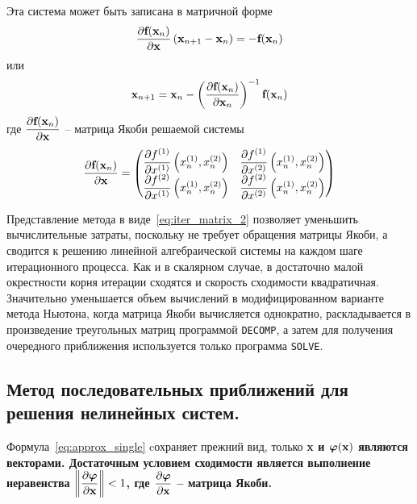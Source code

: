 \documentclass[../../calc-math-exam-2023.tex]{subfiles}
\begin{document}
    Эта система может быть записана в матричной форме
    \begin{equation}
        \frac{\partial \bf{f}(\bf{x}_n)}{\partial \bf{x}} \left( \bf{x}_{n+1} - \bf{x}_n \right) = -\bf{f}(\bf{x}_n) \label{eq:iter_matrix_1}
    \end{equation}
    или
    \begin{equation}
        \bf{x}_{n+1} = \bf{x}_n - \left( \frac{\partial \bf{f}(\bf{x}_n)}{\partial \bf{x}_n} \right)^{-1} \bf{f}(\bf{x}_n) \label{eq:iter_matrix_2}
    \end{equation}
    где $\displaystyle \frac{\partial \bf{f}(\bf{x}_n)}{\partial \bf{x}}$ -- матрица Якоби решаемой системы
    \begin{equation*}
        \frac{\partial \bf{f}(\bf{x}_n)}{\partial \bf{x}} =
        \begin{pmatrix}
            \displaystyle \frac{\partial f^{(1)}}{\partial x^{(1)}}\left( x_n^{(1)}, x_n^{(2)} \right) & \displaystyle \frac{\partial f^{(1)}}{\partial x^{(2)}}\left( x_n^{(1)}, x_n^{(2)} \right) \\
            \displaystyle \frac{\partial f^{(2)}}{\partial x^{(1)}}\left( x_n^{(1)}, x_n^{(2)} \right) & \displaystyle \frac{\partial f^{(2)}}{\partial x^{(2)}}\left( x_n^{(1)}, x_n^{(2)} \right)
        \end{pmatrix}
    \end{equation*}

    Представление метода в виде~\eqref{eq:iter_matrix_2} позволяет уменьшить вычислительные затраты, поскольку не требует
    обращения матрицы Якоби, а сводится к решению линейной алгебраической системы на каждом шаге итерационного процесса.
    Как и в скалярном случае, в достаточно малой окрестности корня итерации сходятся и скорость сходимости квадратичная.
    Значительно уменьшается объем вычислений в модифицированном варианте метода Ньютона, когда матрица Якоби вычисляется
    однократно, раскладывается в произведение треугольных матриц программой \verb|DECOMP|, а затем для получения очередного
    приближения используется только программа \verb|SOLVE|.

    \subsection{Метод последовательных приближений для решения нелинейных систем.}
    Формула~\eqref{eq:approx_single} cохраняет прежний вид, только \bf{x} и $\bm{\varphi}(\bf{x})$ являются векторами.
    Достаточным условием сходимости является выполнение неравенства $\displaystyle \left\| \frac{\partial \bm{\varphi}}{\partial \bf{x}} \right\| < 1$,
    где $\displaystyle \frac{\partial \bm{\varphi}}{\partial \bf{x}}$ -- матрица Якоби.
\end{document}
